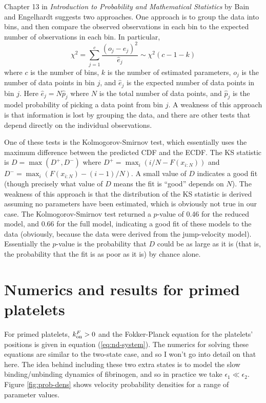 \documentclass{article}
\newcommand{\tn}{\textnormal}
\begin{document}
Chapter 13 in \textit{Introduction to Probability and Mathematical
  Statistics} by Bain and Engelhardt suggests two approaches. One
approach is to group the data into bins, and then compare the observed
observations in each bin to the expected number of observations in
each bin. In particular,
\begin{equation}
  \label{eq:chi2}
  \chi^2 = \sum_{j=1}^c \frac{(o_j - \hat{e}_j)^2}{\hat{e}_j} \sim
  \chi^2(c - 1 - k)
\end{equation}
where $c$ is the number of bins, $k$ is the number of estimated
parameters, $o_j$ is the number of data points in bin $j$, and
$\hat{e}_j$ is the expected number of data points in bin $j$. Here
$\hat{e}_j = N \hat{p}_j$ where $N$ is the total number of data
points, and $\hat{p}_j$ is the model probability of picking a data
point from bin $j$. A weakness of this approach is that information is
lost by grouping the data, and there are other tests that depend
directly on the individual observations.

One of these tests is the Kolmogorov-Smirnov test, which essentially
uses the maximum difference between the predicted CDF and the
ECDF. The KS statistic is $D = \max(D^+, D^-)$ where
$D^+ = \max_i(i/N - F(x_{i:N}))$ and
$D^- = \max_i(F(x_{i:N}) - (i - 1)/N)$. A small value of $D$ indicates
a good fit (though precisely what value of $D$ means the fit is
``good'' depends on $N$). The weakness of this approach is that the
distribution of the KS statistic is derived assuming no parameters
have been estimated, which is obviously not true in our case. The
Kolmogorov-Smirnov test returned a $p$-value of 0.46 for the reduced
model, and 0.66 for the full model, indicating a good fit of these
models to the data (obviously, because the data were derived from the
jump-velocity model). Essentially the $p$-value is the probability
that $D$ could be as large as it is (that is, the probability that the
fit is as poor as it is) by chance alone.

\section{Numerics and results for primed platelets}
\label{sec:numer-results-prim}

For primed platelets, $k_\tn{on}^F > 0$ and the Fokker-Planck equation
for the platelets' positions is given in equation
(\ref{eq:nd-system}). The numerics for solving these equations are
similar to the two-state case, and so I won't go into detail on that
here. The idea behind including these two extra states is to model the
slow binding/unbinding dynamics of fibrinogen, and so in practice we
take $\epsilon_1 \ll \epsilon_2$. Figure \ref{fig:prob-dens} shows
velocity probability densities for a range of parameter values.
\end{document}
